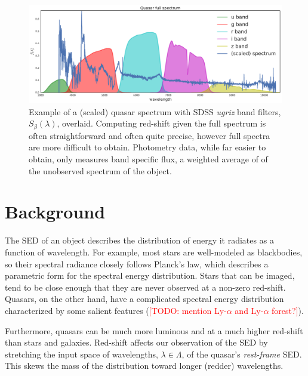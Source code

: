 \documentclass{article}
\newcommand{\red}[1]{\textcolor{red}{[TODO: #1]}}
\begin{document}
\begin{figure}[ht]
\vskip 0.2in
\begin{center}
\centerline{\includegraphics[width=2\columnwidth]{../figs/quasar_spectrum_sdss_filters}}
\caption{Example of a (scaled) quasar spectrum with SDSS \emph{ugriz} band filters, $S_{\beta}(\lambda)$, overlaid.  Computing red-shift given the full spectrum is often straightforward and often quite precise, however full spectra are more difficult to obtain.  Photometry data, while far easier to obtain, only measures band specific flux, a weighted average of of the unobserved spectrum of the object. }
\label{fig:filters}
\end{center}
\vskip -0.2in
\end{figure} 


\section{Background}
\label{sec:background}
The SED of an object describes the distribution of energy it radiates as a function of wavelength.  
For example, most stars are well-modeled as blackbodies, so their spectral radiance closely follows Planck's law, which describes a parametric form for the spectral energy distribution.  Stars that can be imaged, tend to be close enough that they are never observed at a non-zero red-shift. 
Quasars, on the other hand, have a complicated spectral energy distribution characterized by some salient features (\red{mention Ly-$\alpha$ and Ly-$\alpha$ forest?}).  

Furthermore, quasars can be much more luminous and at a much higher red-shift than stars and galaxies.  
Red-shift affects our observation of the SED by stretching the input space of wavelengths, $\lambda \in \Lambda$, of the quasar's \emph{rest-frame} SED.  
This skews the mass of the distribution toward longer (redder) wavelengths. 
\end{document}
